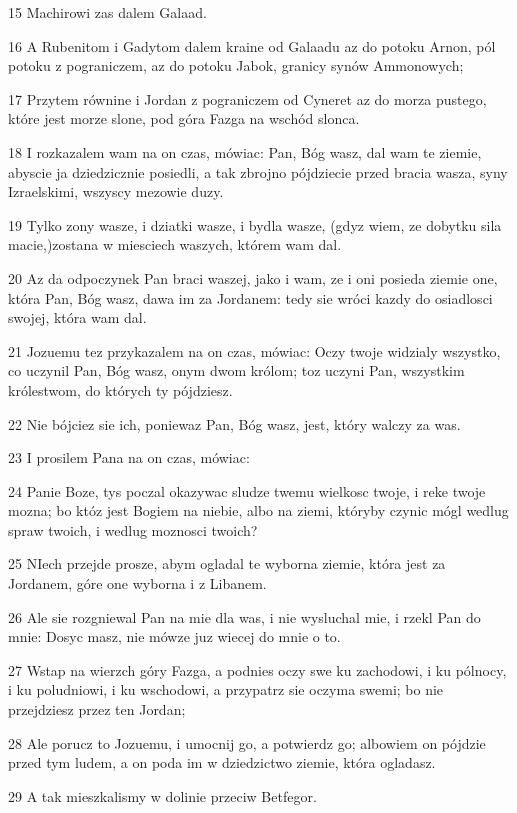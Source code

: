 \par 15 Machirowi zas dalem Galaad.
\par 16 A Rubenitom i Gadytom dalem kraine od Galaadu az do potoku Arnon, pól potoku z pograniczem, az do potoku Jabok, granicy synów Ammonowych;
\par 17 Przytem równine i Jordan z pograniczem od Cyneret az do morza pustego, które jest morze slone, pod góra Fazga na wschód slonca.
\par 18 I rozkazalem wam na on czas, mówiac: Pan, Bóg wasz, dal wam te ziemie, abyscie ja dziedzicznie posiedli, a tak zbrojno pójdziecie przed bracia wasza, syny Izraelskimi, wszyscy mezowie duzy.
\par 19 Tylko zony wasze, i dziatki wasze, i bydla wasze, (gdyz wiem, ze dobytku sila macie,)zostana w miesciech waszych, którem wam dal.
\par 20 Az da odpoczynek Pan braci waszej, jako i wam, ze i oni posieda ziemie one, która Pan, Bóg wasz, dawa im za Jordanem: tedy sie wróci kazdy do osiadlosci swojej, która wam dal.
\par 21 Jozuemu tez przykazalem na on czas, mówiac: Oczy twoje widzialy wszystko, co uczynil Pan, Bóg wasz, onym dwom królom; toz uczyni Pan, wszystkim królestwom, do których ty pójdziesz.
\par 22 Nie bójciez sie ich, poniewaz Pan, Bóg wasz, jest, który walczy za was.
\par 23 I prosilem Pana na on czas, mówiac:
\par 24 Panie Boze, tys poczal okazywac sludze twemu wielkosc twoje, i reke twoje mozna; bo któz jest Bogiem na niebie, albo na ziemi, któryby czynic mógl wedlug spraw twoich, i wedlug moznosci twoich?
\par 25 NIech przejde prosze, abym ogladal te wyborna ziemie, która jest za Jordanem, góre one wyborna i z Libanem.
\par 26 Ale sie rozgniewal Pan na mie dla was, i nie wysluchal mie, i rzekl Pan do mnie: Dosyc masz, nie mówze juz wiecej do mnie o to.
\par 27 Wstap na wierzch góry Fazga, a podnies oczy swe ku zachodowi, i ku pólnocy, i ku poludniowi, i ku wschodowi, a przypatrz sie oczyma swemi; bo nie przejdziesz przez ten Jordan;
\par 28 Ale porucz to Jozuemu, i umocnij go, a potwierdz go; albowiem on pójdzie przed tym ludem, a on poda im w dziedzictwo ziemie, która ogladasz.
\par 29 A tak mieszkalismy w dolinie przeciw Betfegor.

